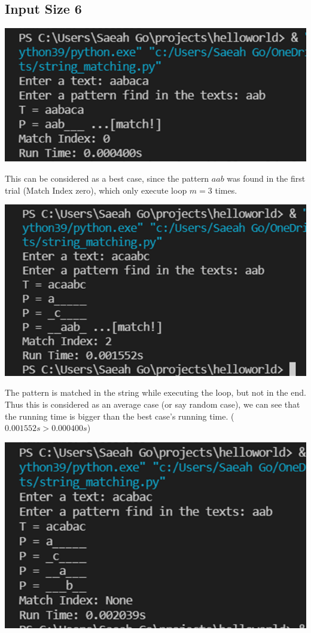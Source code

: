\documentclass{article}
\begin{document}
\subsection{\textbf{Input Size 6}}
\begin{center}
\includegraphics[scale = 0.7]{inputsize 6 best.png} \\
\end{center}
This can be considered as a best case, since the pattern $aab$ was found in the first trial (Match Index zero), which only execute loop $m = 3$ times. 
\begin{center}
\includegraphics[scale = 0.7]{inputsize 6 average.png} \\
\end{center}
The pattern is matched in the string while executing the loop, but not in the end. Thus this is considered as an average case (or say random case), we can see that the running time is bigger than the best case's running time. ($0.001552s > 0.000400s$) 
\begin{center}
\includegraphics[scale = 0.7]{inputsize 6 worst.png} \\
\end{center}
\end{document}
